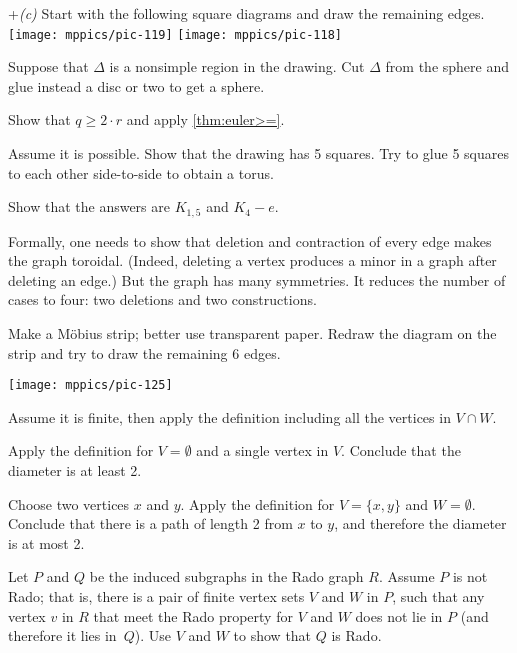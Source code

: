 +\textit{(c)} Start with the following square diagrams and draw the remaining edges.
\vskip2mm
\texttt{[image: mppics/pic-119]}
\hskip5mm
\texttt{[image: mppics/pic-118]}

Suppose that $\Delta$ is a nonsimple region in the drawing.
Cut $\Delta$ from the sphere and glue instead a disc or two to get a sphere.


Show that $q\ge 2\cdot r$ and apply
\ref{thm:euler>=}.

Assume it is possible.
Show that the drawing has 5 squares.
Try to glue 5 squares to each other side-to-side to obtain a torus. 

Show that the answers are $K_{1,5}$ and $K_4-e$.

Formally, one needs to show that deletion and contraction of every edge makes the graph toroidal.
(Indeed, deleting a vertex produces a minor in a graph after deleting an edge.)
But the graph has many symmetries.
It reduces the number of cases to four:
two deletions and two constructions.

Make a Möbius strip; better use transparent paper.
Redraw the diagram on the strip and try to draw the remaining 6 edges.

\begin{Figure}
\centering
\texttt{[image: mppics/pic-125]}
\end{Figure}

\setcounter{eqtn}{0}

Assume it is finite,
then apply the definition including all the vertices in $V\cap W$. 


Apply the definition for $V=\emptyset$ and a single vertex in $V$.
Conclude that the diameter is at least 2.

Choose two vertices $x$ and $y$.
Apply the definition for $V=\{x,y\}$ and $W=\emptyset$.
Conclude that there is a path of length 2 from $x$ to $y$,
and therefore the diameter is at most 2.

Let $P$ and $Q$ be the induced subgraphs in the Rado graph $R$.
Assume $P$ is not Rado; that is, there is a pair of finite vertex sets $V$ and $W$ in $P$, such that any vertex $v$ in $R$ that meet the Rado property for $V$ and $W$ does not lie in $P$ (and therefore it lies in~$Q$).
Use $V$ and $W$ to show that $Q$ is Rado.

